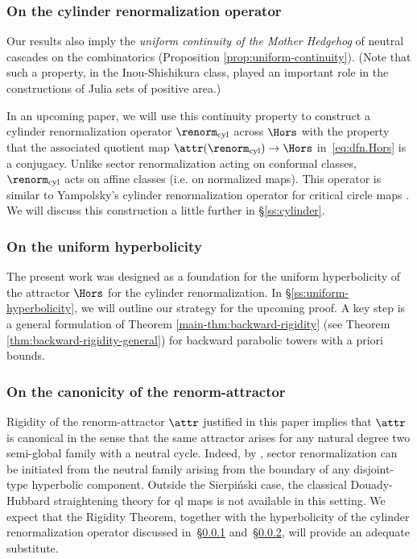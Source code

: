 \documentclass{amsart}
\begin{document}
\subsubsection{On the cylinder renormalization operator}\label{sss:RRcyl}

Our results also imply the {\em uniform continuity of the Mother Hedgehog} of neutral cascades on the combinatorics 
(Proposition \ref{prop:uniform-continuity}).
(Note that such a property, in the Inou-Shishikura class, 
played an important role in the constructions of Julia sets of positive area.) 

In an upcoming paper, we will use this continuity property to construct a cylinder renormalization operator $\renorm_{\textnormal{cyl}}$ across $\Hors$ with the property  that the associated quotient map $\attr(\renorm_{\textnormal{cyl}})\to \Hors$ in~\eqref{eq:dfn.Hors} is a conjugacy. %
Unlike sector renormalization acting on conformal classes, 
$\renorm_{\textnormal{cyl}}$ acts on affine classes 
(i.e.  on normalized maps). 
This operator is similar to Yampolsky's cylinder renormalization operator for critical circle maps \cite{Y03a,Y03b}. 
We will discuss this construction a little further in \S\ref{ss:cylinder}.


\subsubsection{On the uniform hyperbolicity}\label{sss:unif_hyperb} The present work was designed as a foundation 
for the uniform hyperbolicity of the attractor $\Hors$ for the cylinder renormalization. In \S\ref{ss:uniform-hyperbolicity},
we will outline our strategy for the upcoming proof.  
A key step  is a general formulation of Theorem \ref{main-thm:backward-rigidity}
(see Theorem \ref{thm:backward-rigidity-general}) for backward parabolic towers with a priori bounds.



\subsubsection{On the canonicity of the renorm-attractor} Rigidity of the renorm-attractor $\attr$ justified in this paper implies that $\attr$ is canonical in the sense that the same attractor arises for any natural degree two semi-global family with a neutral cycle.  Indeed, by \cite{DLL25,DLu25}, sector renormalization can be initiated from the neutral family arising from the boundary of any disjoint-type hyperbolic component.  Outside the Sierpi\'nski case, the classical Douady-Hubbard straightening theory for ql maps is not available in this setting. We expect that the Rigidity Theorem, together with the hyperbolicity of the cylinder renormalization operator discussed in~\S\ref{sss:RRcyl} and~\S\ref{sss:unif_hyperb}, will provide an adequate substitute.
\end{document}
